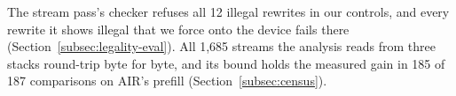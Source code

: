 The stream pass's checker refuses all 12 illegal rewrites in our controls, and every rewrite it shows illegal that we force onto the device fails there (Section~\ref{subsec:legality-eval}).
All 1{,}685 streams the analysis reads from three stacks round-trip byte for byte, and its bound holds the measured gain in 185 of 187 comparisons on AIR's prefill (Section~\ref{subsec:census}).

